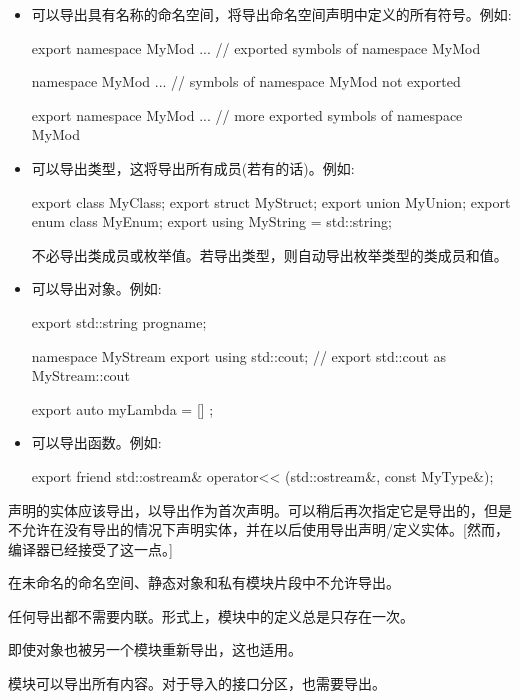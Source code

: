 \begin{itemize}
\item 
可以导出具有名称的命名空间，将导出命名空间声明中定义的所有符号。例如:

\begin{cpp}
export namespace MyMod {
	... // exported symbols of namespace MyMod
}

namespace MyMod {
	... // symbols of namespace MyMod not exported
}

export namespace MyMod {
	... // more exported symbols of namespace MyMod
}
\end{cpp}


\item 
可以导出类型，这将导出所有成员(若有的话)。例如:

\begin{cpp}
export class MyClass;
export struct MyStruct;
export union MyUnion;
export enum class MyEnum;
export using MyString = std::string;
\end{cpp}

不必导出类成员或枚举值。若导出类型，则自动导出枚举类型的类成员和值。

\item 
可以导出对象。例如:

\begin{cpp}
export std::string progname;

namespace MyStream {
	export using std::cout; // export std::cout as MyStream::cout
}

export auto myLambda = [] {};
\end{cpp}

\item 
可以导出函数。例如:

\begin{cpp}
export friend std::ostream& operator<< (std::ostream&, const MyType&);
\end{cpp}
\end{itemize}

声明的实体应该导出，以导出作为首次声明。可以稍后再次指定它是导出的，但是不允许在没有导出的情况下声明实体，并在以后使用导出声明/定义实体。[然而，编译器已经接受了这一点。]

在未命名的命名空间、静态对象和私有模块片段中不允许导出。

任何导出都不需要内联。形式上，模块中的定义总是只存在一次。

即使对象也被另一个模块重新导出，这也适用。


模块可以导出所有内容。对于导入的接口分区，也需要导出。

